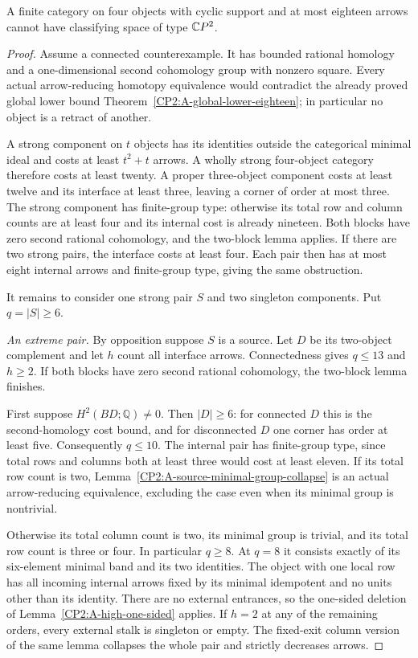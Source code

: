 \begin{theorem}
\label{CP2:A-strong-four-eighteen}
A finite category on four objects with cyclic support and at
most eighteen arrows cannot have classifying space of type $\mathbb{C}P^2$.
\end{theorem}
\begin{proof}
Assume a connected counterexample. It has bounded rational
homology and a one-dimensional second cohomology group with
nonzero square. Every actual arrow-reducing homotopy equivalence
would contradict the already proved global lower bound
Theorem~\ref{CP2:A-global-lower-eighteen}; in particular no
object is a retract of another.

A strong component on $t$ objects has its identities outside
the categorical minimal ideal and costs at least $t^2+t$ arrows.
A wholly strong four-object category therefore costs at least
twenty. A proper three-object component costs at least twelve
and its interface at least three, leaving a corner of order
at most three. The strong component has finite-group type:
otherwise its total row and column counts are at least four
and its internal cost is already nineteen. Both blocks have
zero second rational cohomology, and the two-block lemma applies.
If there are two strong pairs, the interface costs at least
four. Each pair then has at most eight internal arrows and
finite-group type, giving the same obstruction.

It remains to consider one strong pair $S$ and two singleton
components. Put $q=|S|\ge6$.

\emph{An extreme pair.} By opposition suppose $S$ is a source.
Let $D$ be its two-object complement and let $h$ count all
interface arrows. Connectedness gives $q\le13$ and $h\ge2$.
If both blocks have zero second rational cohomology, the
two-block lemma finishes.

First suppose $H^2(BD;\mathbb Q)\ne0$. Then $|D|\ge6$:
for connected $D$ this is the second-homology cost bound,
and for disconnected $D$ one corner has order at least five.
Consequently $q\le10$. The internal pair has finite-group
type, since total rows and columns both at least three
would cost at least eleven. If its total row count is two,
Lemma~\ref{CP2:A-source-minimal-group-collapse} is an actual
arrow-reducing equivalence, excluding the case even when its
minimal group is nontrivial.

Otherwise its total column count is two, its minimal group
is trivial, and its total row count is three or four. In
particular $q\ge8$. At $q=8$ it consists exactly of its
six-element minimal band and its two identities. The object
with one local row has all incoming internal arrows fixed by
its minimal idempotent and no units other than its identity.
There are no external entrances, so the one-sided deletion
of Lemma~\ref{CP2:A-high-one-sided} applies. If $h=2$ at
any of the remaining orders, every external stalk is singleton
or empty. The fixed-exit column version of the same lemma
collapses the whole pair and strictly decreases arrows.


\end{proof}
